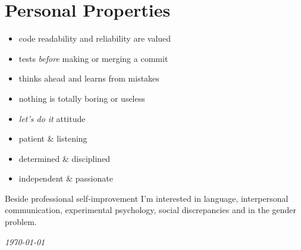 \documentclass[a4paper,12pt]{article}
\newcommand\Yell{\textbf}
\newcommand\Label{\textsf}
\newcommand{\compress}{\setlength\itemsep{-\parskip}}
\newcommand{\midline}{\rule[0.5ex]{\linewidth-\parindent}{.5pt}}
\newenvironment{compressedItemize}{\begin{itemize}\compress}{\end{itemize}}
\begin{document}
%

\section{Personal Properties}

\begin{multicols}{2}
\begin{compressedItemize}
\item	code readability and reliability are valued
\item	tests \textit{before} making or merging a commit
\item	thinks ahead and learns from mistakes
\item	nothing is totally boring or useless
\columnbreak
\item	\textit{let's do it} attitude
\item	patient \& listening
\item	determined \& disciplined
\item	independent \& passionate
\end{compressedItemize}
\end{multicols}

\medskip

Beside professional self-improvement I'm interested in language, interpersonal
communication, experimental psychology, social discrepancies and in the gender
problem.

\center\itshape\today
\end{document}
